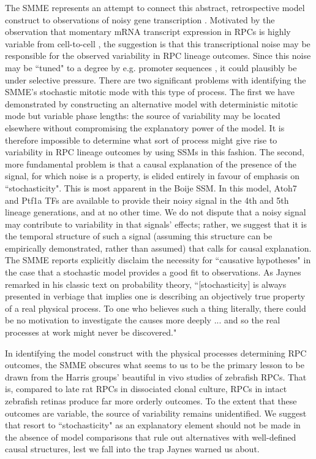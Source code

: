 The SMME represents an attempt to connect this abstract, retrospective model construct to observations of noisy gene transcription \cite{Raj2008}. Motivated by the observation that momentary mRNA transcript expression in RPCs is highly variable from cell-to-cell \cite{Trimarchi2008}, the suggestion is that this transcriptional noise may be responsible for the observed variability in RPC lineage outcomes. Since this noise may be ``tuned" to a degree by e.g. promoter sequences \cite{Raser2004}, it could plausibly be under selective pressure. There are two significant problems with identifying the SMME's stochastic mitotic mode with this type of process. The first we have demonstrated by constructing an alternative model with deterministic mitotic mode but variable phase lengths: the source of variability may be located elsewhere without compromising the explanatory power of the model. It is therefore impossible to determine what sort of process might give rise to variability in RPC lineage outcomes by using SSMs in this fashion. The second, more fundamental problem is that a causal explanation of the presence of the signal, for which noise is a property, is elided entirely in favour of emphasis on ``stochasticity". This is most apparent in the Boije SSM. In this model, Atoh7 and Ptf1a TFs are available to provide their noisy signal in the 4th and 5th lineage generations, and at no other time. We do not dispute that a noisy signal may contribute to variability in that signals' effects; rather, we suggest that it is the temporal structure of such a signal (assuming this structure can be empirically demonstrated, rather than assumed) that calls for causal explanation. The SMME reports explicitly disclaim the necessity for ``causative hypotheses" in the case that a stochastic model provides a good fit to observations. As Jaynes remarked in his classic text on probability theory, ``[stochasticity] is always presented in verbiage that implies one is describing an objectively true property of a real physical process. To one who believes such a thing literally, there could be no motivation to investigate the causes more deeply ... and so the real processes at work might never be discovered." \cite{Jaynes2003} 

In identifying the model construct with the physical processes determining RPC outcomes, the SMME obscures what seems to us to be the primary lesson to be drawn from the Harris groups' beautiful in vivo studies of zebrafish RPCs. That is, compared to late rat RPCs in dissociated clonal culture, RPCs in intact zebrafish retinas produce far more orderly outcomes. To the extent that these outcomes are variable, the source of variability remains unidentified. We suggest that resort to ``stochasticity" as an explanatory element should not be made in the absence of model comparisons that rule out alternatives with well-defined causal structures, lest we fall into the trap Jaynes warned us about.